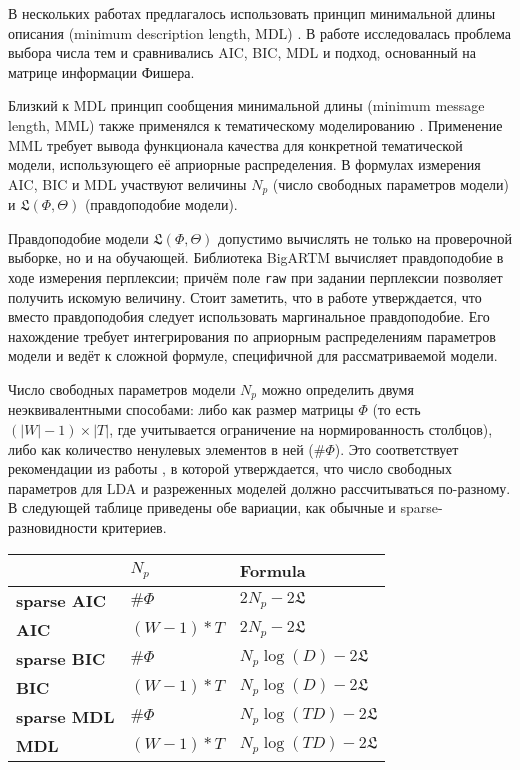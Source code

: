 В нескольких работах предлагалось  использовать принцип минимальной длины описания (minimum description length, MDL) \cite{image_segm,gerlach2018network}. В работе \cite{mml0} исследовалась проблема выбора числа тем и сравнивались AIC, BIC, MDL и подход, основанный на матрице информации Фишера.

Близкий к MDL принцип сообщения минимальной длины (minimum message length, MML) также применялся к тематическому моделированию \cite{mml1,mml2,mml3,mml4,mml5}.
Применение MML требует вывода функционала качества для конкретной тематической модели, использующего её априорные распределения. В формулах измерения AIC, BIC и MDL участвуют величины $N_p$ (число свободных параметров модели) и $\mathfrak{L}(\Phi,\Theta)$ (правдоподобие модели).

Правдоподобие модели $\mathfrak{L}(\Phi,\Theta)$ допустимо вычислять не только на проверочной выборке, но и на обучающей. Библиотека BigARTM вычисляет правдоподобие в ходе измерения перплексии; причём поле \texttt{raw} при задании перплексии позволяет получить искомую величину. Стоит заметить, что в работе \cite{gerlach2018network} утверждается, что вместо правдоподобия следует использовать маргинальное правдоподобие. Его нахождение требует интегрирования по априорным распределениям параметров модели и ведёт к сложной формуле, специфичной для рассматриваемой модели.

Число свободных параметров модели $N_p$ можно определить двумя неэквивалентными способами: либо как размер матрицы $\Phi$ (то есть $(|W|-1) \times |T|$, где учитывается ограничение на нормированность столбцов), либо как количество ненулевых элементов в ней ($\#\Phi$). Это соответствует рекомендации из работы \cite{than2012fully}, в которой утверждается, что число свободных параметров для LDA и разреженных моделей должно рассчитываться по-разному. В следующей таблице приведены обе вариации, как обычные и sparse-разновидности критериев.

\begin{table}[h]
    \centering
    \begin{tabular}{lll}
    \toprule
               & $N_p$       & Formula                                             \\
    \midrule
    \textbf{sparse AIC} & $\#\Phi$       & $2 N_p - 2 \mathfrak{L}$                \\
    \textbf{AIC}        & $(W - 1) * T$  & $2 N_p - 2 \mathfrak{L}$                \\
    \textbf{sparse BIC} & $\#\Phi$       & $N_p \log(D) - 2 \mathfrak{L}$          \\
    \textbf{BIC}        & $(W - 1) * T$  & $N_p \log(D) - 2 \mathfrak{L}$          \\
    \textbf{sparse MDL} & $\#\Phi$       & $N_p \log(TD) - 2 \mathfrak{L}$         \\
    \textbf{MDL}        & $(W - 1) * T$  & $N_p \log(TD) - 2 \mathfrak{L}$\\
    \bottomrule
    \end{tabular}
\end{table}

